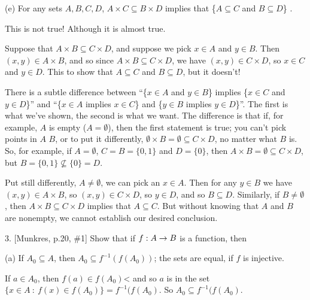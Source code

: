 \ssk

\item{} (e) For any sets $A,B,C,D$, $A\times C \subseteq B\times D$ implies that 
\{$A\subseteq C$ and $B\subseteq D$\} .

\msk

This is not true! Although it is almost true. 

\ssk

Suppose that $A\times B \subseteq C\times D$, and suppose we pick
$x\in A$ and $y\in B$. Then $(x,y)\in A\times B$, and so since
$A\times B \subseteq C\times D$, we have $(x,y)\in C\times D$, 
so $x\in C$ and $y\in D$. This  to show that
$A\subseteq C$ and $B\subseteq D$, but it doesn't! 

\ssk

There is a subtle difference between ``\{$x\in A$ and $y\in B$\}
implies \{$x\in C$ and $y\in D$\}'' and 
``\{$x\in A$ implies $x\in C$\} and \{$y\in B$ implies $y\in D$\}''.
The first is what we've shown, the second is what we want. The difference
is that if, for example, $A$ is empty ($A = \emptyset$), then the first
statement is  true; you can't pick points in $A$ 
$B$, or to put it differently, $\emptyset\times B = \emptyset\subseteq C\times D$,
no matter what $B$ is. So, for example, if $A=\emptyset$, $C=B=\{0,1\}$ and $D=\{0\}$,
then $A\times B = \emptyset \subseteq C\times D$, but $B = \{0,1\}\not\subseteq \{0\} = D$.

\ssk

Put still differently,  $A\neq\emptyset$, we can pick an
$x\in A$. Then for any $y\in B$ we have $(x,y)\in A\times B$, so 
$(x,y)\in C\times D$, so $y\in D$, and so $B\subseteq D$. Similarly,
if $B\neq\emptyset$, then $A\times B \subseteq C\times D$ implies that
$A\subseteq C$. But without knowing that $A$ and $B$ are nonempty, we
cannot establish our desired conclusion.

\ssk

\item{3.} [Munkres, p.20, \#1] Show that if $f:A\rightarrow B$ is a function, then

\ssk

\item{} (a) If $A_0\subseteq A$, then $A_0\subseteq f^{-1}(f(A_0))$; the sets are equal,
if $f$ is injective.

\ssk

If $a\in A_0$, then $f(a)\in f(A_0)$< and so $a$ is in the set $\{x\in A\ :\ f(x)\in f(A_0)\}=f^{-1}(f(A_0)$.
So $A_0\subseteq f^{-1}(f(A_0)$.

